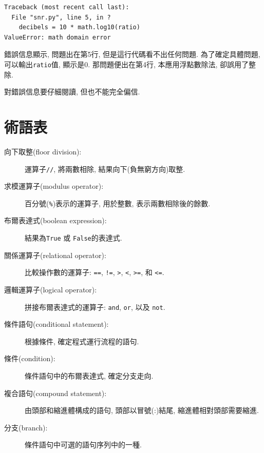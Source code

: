 \documentclass[10pt]{book}
\begin{document}
\begin{verbatim}
Traceback (most recent call last):
  File "snr.py", line 5, in ?
    decibels = 10 * math.log10(ratio)
ValueError: math domain error
\end{verbatim}
%
錯誤信息顯示, 問題出在第5行, 
但是這行代碼看不出任何問題. 
為了確定具體問題, 可以輸出{\tt ratio}值, 顯示是0.
那問題便出在第4行, 本應用浮點數除法, 卻誤用了整除.

對錯誤信息要仔細閱讀, 但也不能完全偏信. 


\section{術語表}

\begin{description}

\item[向下取整(floor division):] 運算子{\tt //}, 將兩數相除, 結果向下(負無窮方向)取整.

\item[求模運算子(modulus operator):]  百分號({\tt \%})表示的運算子, 用於整數, 表示兩數相除後的餘數. 

\item[布爾表達式(boolean expression):]  結果為{\tt True} 或 {\tt False}的表達式.

\item[關係運算子(relational operator):] 比較操作數的運算子: 
{\tt ==}, {\tt !=}, {\tt >}, {\tt <}, {\tt >=}, 和 {\tt <=}.

\item[邏輯運算子(logical operator):]  拼接布爾表達式的運算子: 
{\tt and}, {\tt or}, 以及 {\tt not}.

\item[條件語句(conditional statement):]  根據條件, 確定程式運行流程的語句.

\item[條件(condition):] 條件語句中的布爾表達式, 確定分支走向.

\item[複合語句(compound statement):]  由頭部和縮進體構成的語句, 頭部以冒號(:)結尾, 
縮進體相對頭部需要縮進.

\item[分支(branch):] 條件語句中可選的語句序列中的一種. 


\end{description}
\end{document}
